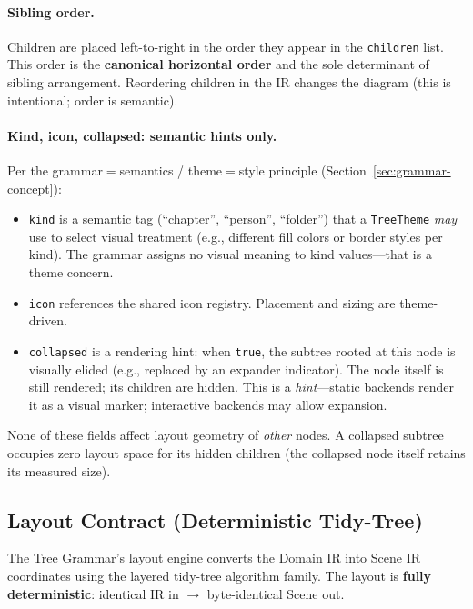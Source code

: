 \paragraph{Sibling order.}
Children are placed left-to-right in the order they appear in the \texttt{children} list. This order is the \textbf{canonical horizontal order} and the sole determinant of sibling arrangement. Reordering children in the IR changes the diagram (this is intentional; order is semantic).

\paragraph{Kind, icon, collapsed: semantic hints only.}
Per the grammar$=$semantics / theme$=$style principle (Section~\ref{sec:grammar-concept}):
\begin{itemize}
  \item \texttt{kind} is a semantic tag (``chapter'', ``person'', ``folder'') that a \texttt{TreeTheme} \emph{may} use to select visual treatment (e.g., different fill colors or border styles per kind). The grammar assigns no visual meaning to kind values---that is a theme concern.
  \item \texttt{icon} references the shared icon registry. Placement and sizing are theme-driven.
  \item \texttt{collapsed} is a rendering hint: when \texttt{true}, the subtree rooted at this node is visually elided (e.g., replaced by an expander indicator). The node itself is still rendered; its children are hidden. This is a \emph{hint}---static backends render it as a visual marker; interactive backends may allow expansion.
\end{itemize}

None of these fields affect layout geometry of \emph{other} nodes. A collapsed subtree occupies zero layout space for its hidden children (the collapsed node itself retains its measured size).

\subsection{Layout Contract (Deterministic Tidy-Tree)}
\label{sec:tree-layout-contract}

The Tree Grammar's layout engine converts the Domain IR into Scene IR coordinates using the layered tidy-tree algorithm family. The layout is \textbf{fully deterministic}: identical IR in $\rightarrow$ byte-identical Scene out.

